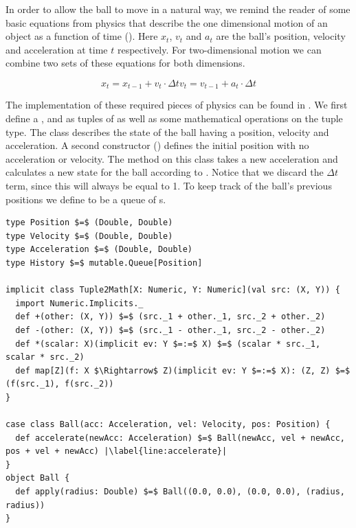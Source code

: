 In order to allow the ball to move in a natural way, we remind the reader of some basic equations from physics that describe the one dimensional motion of an object as a function of time (). Here $x_t$, $v_t$ and $a_t$ are the ball's position, velocity and acceleration at time $t$ respectively. For two-dimensional motion we can combine two sets of these equations for both dimensions.

\begin{subequations}
	\begin{equation}
		x_t = x_{t - 1} + v_t \cdot \Delta t
	\end{equation}
	\begin{equation}
		v_t = v_{t - 1} + a_t \cdot \Delta t
	\end{equation}
	\label{eq:motion}
\end{subequations}

The implementation of these required pieces of physics can be found in . We first define a ,  and  as tuples of  as well as some mathematical operations on the tuple type. The  class describes the state of the ball having a position, velocity and acceleration. A second constructor () defines the initial position with no acceleration or velocity. The method  on this class takes a new acceleration and calculates a new state for the ball according to . Notice that we discard the $\Delta t$ term, since this will always be equal to 1. To keep track of the ball's previous positions we define  to be a queue of s.

\begin{minipage}{\linewidth}
\begin{lstlisting}[style=ScalaStyle, caption={Ball motion physics}, label={lst:ball-physics}]
type Position $=$ (Double, Double)
type Velocity $=$ (Double, Double)
type Acceleration $=$ (Double, Double)
type History $=$ mutable.Queue[Position]

implicit class Tuple2Math[X: Numeric, Y: Numeric](val src: (X, Y)) {
  import Numeric.Implicits._
  def +(other: (X, Y)) $=$ (src._1 + other._1, src._2 + other._2)
  def -(other: (X, Y)) $=$ (src._1 - other._1, src._2 - other._2)
  def *(scalar: X)(implicit ev: Y $=:=$ X) $=$ (scalar * src._1, scalar * src._2)
  def map[Z](f: X $\Rightarrow$ Z)(implicit ev: Y $=:=$ X): (Z, Z) $=$ (f(src._1), f(src._2))
}

case class Ball(acc: Acceleration, vel: Velocity, pos: Position) {
  def accelerate(newAcc: Acceleration) $=$ Ball(newAcc, vel + newAcc, pos + vel + newAcc) |\label{line:accelerate}|
}
object Ball {
  def apply(radius: Double) $=$ Ball((0.0, 0.0), (0.0, 0.0), (radius, radius))
}
\end{lstlisting}
\end{minipage}

